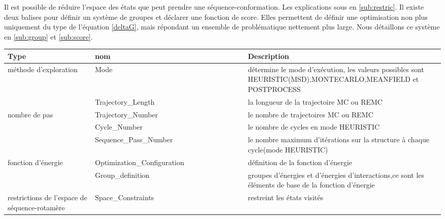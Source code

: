 Il est possible de réduire l'espace des états que peut prendre une séquence-conformation. Les explications sous en \ref{sub:restric}.  Il existe deux balises pour définir un système de groupes et déclarer une fonction de score. Elles permettent de définir une optimisation non plus uniquement du type de l'équation \ref{deltaG}, mais répondant un ensemble de problématique nettement plus large. Nous détaillons ce système  en \ref{sub:group} et \ref{sub:score}.

    \begin{table}[!htbp]
      \centering

      \begin{tabular}{|p{0.2\linewidth}|p{0.35\linewidth}|p{0.45\linewidth}|}

        \hline
        Type   & nom & Description \\
        \hline
          méthode  d'exploration & Mode &  détermine  le mode d'exécution, les valeurs possibles sont HEURISTIC(MSD),MONTECARLO,MEANFIELD et POSTPROCESS  \\  \hline    
                        & Trajectory\_Length  &  la longueur de la trajectoire MC ou REMC\\  \cline{2-3}
        nombre de pas & Trajectory\_Number  &  le nombre de trajectoires  MC ou REMC  \\  \cline{2-3}
                        & Cycle\_Number  &    le nombre de cycles en mode HEURISTIC   \\ \cline{2-3}  
                        & Sequence\_Pass\_Number  &  le nombre maximum d'itérations sur  la structure à chaque cycle(mode HEURISTIC)    \\ \hline  

        fonction d'énergie &  Optimization\_Configuration &   définition de la fonction d'énergie\\               \cline{2-3}
                        &  Group\_definition &   groupes  d'énergies et d'énergies d'interactions,ce sont les éléments de base de la fonction d'énergie\\  \hline  
        restrictions de l'espace de  séquence-rotamère & Space\_Constraints   &  restreint les états visités \\ \hline                
                         

\end{tabular}
\end{table}
